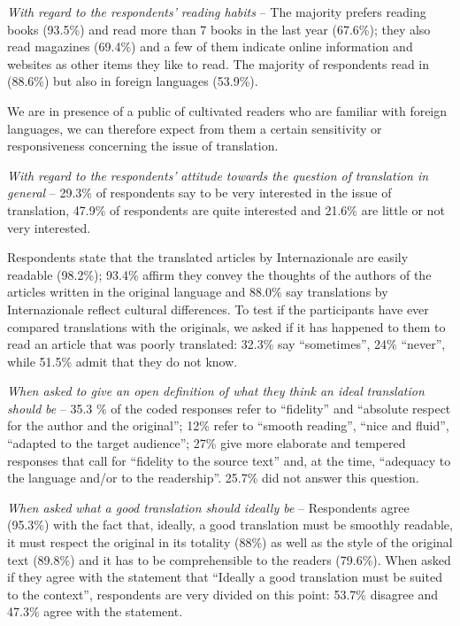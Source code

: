 \documentclass[output=paper]{LSP/langsci}
\begin{document}
\textit{With regard to the respondents'} \textit{reading habits} -- The majority prefers reading books (93.5\%) and read more than 7 books in the last year (67.6\%); they also read magazines (69.4\%) and a few of them indicate online information and websites as other items they like to read. The majority of respondents read in  (88.6\%) but also in foreign languages (53.9\%). 

We are in presence of a public of cultivated readers who are familiar with foreign languages, we can therefore expect from them a certain sensitivity or responsiveness concerning the issue of translation.

\textit{With regard to the} \textit{respondents'} \textit{attitude towards the question of} \textit{translation in general} -- 29.3\% of respondents say to be very interested in the issue of translation, 47.9\% of respondents are quite interested and 21.6\% are little or not very %
interested. 

Respondents state that the translated articles by Internazionale are easily readable (98.2\%); 93.4\% affirm they convey the thoughts of the authors of the articles written in the %
original language and 88.0\% say translations by Internazionale reflect cultural differences. To test if the participants have ever compared translations with the originals, we asked if it has happened to them to read an article that was poorly translated: 32.3\% say ``sometimes'', 24\% ``never'', while 51.5\% admit that they do not know.

\largerpage
\textit{When asked to give an open definition of what they think an ideal} \textit{translation should} \textit{be} -- 35.3 \% of the coded responses refer to ``fidelity'' and ``absolute respect for the author and the original''; 12\% refer to ``smooth reading'', ``nice and fluid'', ``adapted to the target audience''; 27\% give more elaborate and tempered responses that call for ``fidelity to the source text'' and, at the time, ``adequacy to the  language and/or to the  readership''. 25.7\% did not answer this question. 

\textit{When asked} \textit{what a good translation should ideally be} -- Respondents agree (95.3\%) with the fact that, ideally, a good translation must be smoothly readable, it must respect the original in its totality (88\%) as well as the style of the original text (89.8\%) and it has to be comprehensible to the  readers (79.6\%). When asked if they agree with the statement that ``Ideally a good translation must be suited to the  context'', respondents are very divided on this point: 53.7\% disagree and 47.3\% agree with the statement. 
\end{document}
